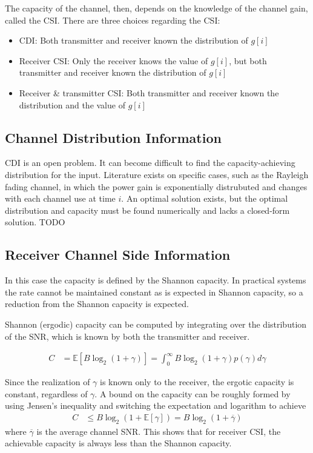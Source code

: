 \documentclass[12pt]{report} %
\newcommand{\E}[1]{\mathbb{E}\left[ #1 \right]}
\begin{document}
The capacity of the channel, then, depends on the knowledge of the channel gain, called the \gls{CSI}. There are three choices regarding the \gls{CSI}:

\begin{itemize}
  \item \gls{CDI}: Both transmitter and receiver known the distribution of $g[i]$
  \item Receiver \gls{CSI}: Only the receiver knows the value of $g[i]$, but both transmitter and receiver known the distribution of $g[i]$
  \item Receiver \& transmitter \gls{CSI}:  Both transmitter and receiver known the distribution and the value of $g[i]$
\end{itemize}

\subsection{Channel Distribution Information}
CDI is an open problem. It can become difficult to find the capacity-achieving
distribution for the input. Literature exists on specific cases, such as the
Rayleigh fading channel, in which the power gain is exponentially distrubuted
and changes with each channel use at time $i$. An optimal solution exists, but
the optimal distribution and capacity must be found numerically and lacks a
closed-form solution.
TODO
\subsection{Receiver Channel Side Information}
In this case the capacity is defined by the Shannon capacity. In practical systems the rate cannot be maintained constant as is expected in Shannon capacity, so a reduction from the Shannon capacity is expected.

Shannon (ergodic) capacity can be computed by integrating over the distribution of the \gls{SNR}, which is known by both the transmitter and receiver.

\begin{align}
  C & = \E{B\log_{2}(1+\gamma)} =\int_0^{\infty}B \log_{2}(1+\gamma)p(\gamma)d\gamma
\end{align}

Since the realization of $\gamma$ is known only to the receiver, the ergotic capacity is constant, regardless of $\gamma$. A bound on the capacity can be roughly formed by using Jensen's inequality and switching the expectation and logarithm to achieve
\begin{align}
  C & \leq B\log_{2}(1+\E{\gamma}) = B\log_{2}(1+\overline{\gamma})
\end{align}
where $\overline{\gamma}$ is the average channel \gls{SNR}. This shows that for receiver \gls{CSI}, the achievable capacity is always less than the Shannon capacity.
\end{document}
